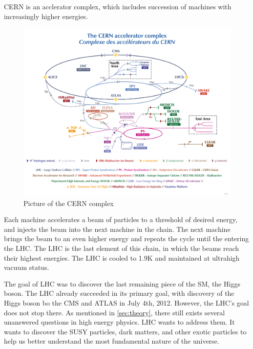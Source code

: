CERN is an acclerator complex, which includes succession of machines with increasingly higher energies. 
\begin{figure}[h!]
	\caption{Picture of the CERN complex \cite{CERN}}
  \label{fig:CERN}
  \centering
  \includegraphics[width=0.9\linewidth]{figs/LHC.png}
\end{figure}
Each machine accelerates a beam of particles to a threshold of desired energy, and injects the beam into the next machine in the chain. 
The next machine brings the beam to an even higher energy and repeats the cycle until the entering the LHC. 
The LHC is the last element of this chain, in which the beams reach their highest energies.
The LHC is cooled to 1.9K and maintained at ultrahigh vacuum status.

The goal of LHC was to discover the last remaining piece of the SM, the Higgs boson.
The LHC already succeeded in its primary goal, with discovery of the Higgs boson bo the CMS and ATLAS in July 4th, 2012.
However, the LHC's goal does not stop there. 
As mentioned in \ref{sec:theory}, there still exists several unanswered questions in high energy physics.
LHC wants to address them. It wants to discover the SUSY particles, dark matters, and other exotic particles to help us better understand the most fundamental nature of the universe.


